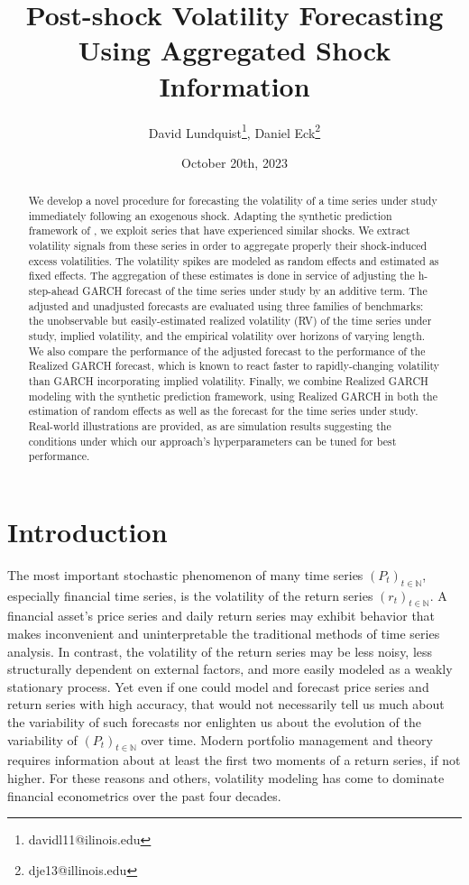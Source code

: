 \documentclass[11pt]{article}
\title{Post-shock Volatility Forecasting Using Aggregated Shock Information}
\author{David Lundquist\thanks{davidl11@ilinois.edu}, Daniel Eck\thanks{dje13@illinois.edu} }
\affil{Department of Statistics, University of Illinois at Urbana-Champaign}
\date{October 20th, 2023}
\theoremstyle{definition}
\begin{document}
\maketitle

\begin{abstract}
We develop a novel procedure for forecasting the volatility of a time series under study immediately following an exogenous shock.  Adapting the synthetic prediction framework of \citet{lin2021minimizing}, we exploit series that have experienced similar shocks.  We extract volatility signals from these series in order to aggregate properly their shock-induced excess volatilities.  The volatility spikes are modeled as random effects and estimated as fixed effects.  The aggregation of these estimates is done in service of adjusting the h-step-ahead GARCH forecast of the time series under study by an additive term.  The adjusted and unadjusted forecasts are evaluated using three families of benchmarks: the unobservable but easily-estimated realized volatility (RV) of the time series under study, implied volatility, and the empirical volatility over horizons of varying length.  We also compare the performance of the adjusted forecast to the performance of the Realized GARCH forecast, which is known to react faster to rapidly-changing volatility than GARCH incorporating implied volatility.   Finally, we combine Realized GARCH modeling with the synthetic prediction framework, using Realized GARCH in both the estimation of random effects as well as the forecast for the time series under study.  Real-world illustrations are provided, as are simulation results suggesting the conditions under which our approach's hyperparameters can be tuned for best performance.
\end{abstract}


\section{Introduction}

The most important stochastic phenomenon of many time series $(P_{t})_{t\in\mathbb{N}}$, especially financial time series, is the volatility of the return series $(r_{t})_{t\in\mathbb{N}}$.  A financial asset's price series and daily return series may exhibit behavior that makes inconvenient and uninterpretable the traditional methods of time series analysis.  In contrast, the volatility of the return series may be less noisy, less structurally dependent on external factors, and more easily modeled as a weakly stationary process.  Yet even if one could model and forecast price series and return series with high accuracy, that would not necessarily tell us much about the variability of such forecasts nor enlighten us about the evolution of the variability of $(P_{t})_{t\in\mathbb{N}}$ over time. Modern portfolio management and theory requires information about at least the first two moments of a return series, if not higher.  For these reasons and others, volatility modeling has come to dominate financial econometrics over the past four decades.  
\end{document}
